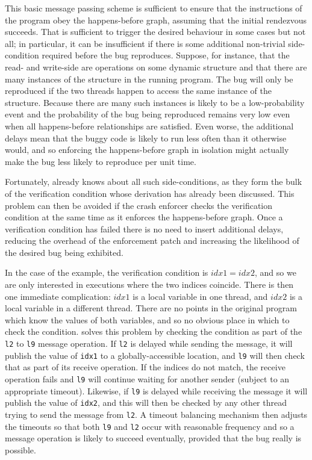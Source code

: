 This basic message passing scheme is sufficient to ensure that the
instructions of the program obey the happens-before graph, assuming
that the initial rendezvous succeeds.  That is sufficient to trigger
the desired behaviour in some cases but not all; in particular, it can
be insufficient if there is some additional non-trivial side-condition
required before the bug reproduces.  Suppose, for instance, that the
read- and write-side {\StateMachines} are operations on some dynamic
structure and that there are many instances of the structure in the
running program.  The bug will only be reproduced if the two threads
happen to access the same instance of the structure.  Because there
are many such instances is likely to be a low-probability event and
the probability of the bug being reproduced remains very low even when
all happens-before relationships are satisfied.  Even worse, the
additional delays mean that the buggy code is likely to run less often
than it otherwise would, and so enforcing the happens-before graph in
isolation might actually make the bug less likely to reproduce per
unit time.

Fortunately, {\technique} already knows about all such
side-conditions, as they form the bulk of the verification condition
whose derivation has already been discussed.  This problem can then be
avoided if the crash enforcer checks the verification condition at the
same time as it enforces the happens-before graph.  Once a
verification condition has failed there is no need to insert
additional delays, reducing the overhead of the enforcement patch and
increasing the likelihood of the desired bug being exhibited.

In the case of the example, the verification condition is $idx1 =
idx2$, and so we are only interested in executions where the two
indices coincide.  There is then one immediate complication: $idx1$ is
a local variable in one thread, and $idx2$ is a local variable in a
different thread.  There are no points in the original program which
know the values of both variables, and so no obvious place in which to
check the condition.  {\Technique} solves this problem by checking the
condition as part of the \verb|l2| to \verb|l9| message operation.  If
\verb|l2| is delayed while sending the message, it will publish the
value of \verb|idx1| to a globally-accessible location, and \verb|l9|
will then check that as part of its receive operation.  If the indices
do not match, the receive operation fails and \verb|l9| will continue
waiting for another sender (subject to an appropriate timeout).
Likewise, if \verb|l9| is delayed while receiving the message it will
publish the value of \verb|idx2|, and this will then be checked by any
other thread trying to send the message from \verb|l2|.  A timeout
balancing mechanism then adjusts the timeouts so that both \verb|l9|
and \verb|l2| occur with reasonable frequency and so a message
operation is likely to succeed eventually, provided that the bug
really is possible.

